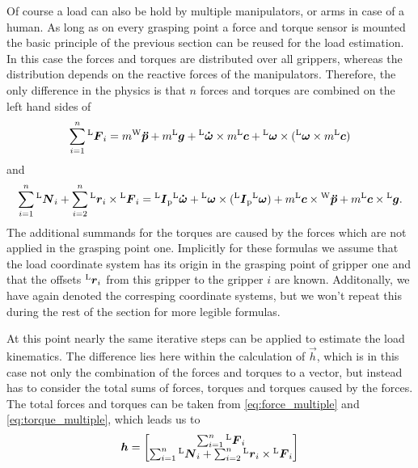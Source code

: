 Of course a load can also be hold by multiple manipulators, or arms in case of a human. As long as on every grasping point a force and torque sensor is mounted the basic principle of the previous section can be reused for the load estimation. In this case the forces and torques are distributed over all grippers, whereas the distribution depends on the reactive forces of the manipulators. Therefore, the only difference in the physics is that $n$ forces and torques are combined on the left hand sides of
\begin{equation}
	\sum_{i = 1}^{n}  {^{\mathrm{L}}}\boldsymbol{F}_{i} = m {^{\mathrm{W}}}\boldsymbol{\ddot{p}} + m {^{\mathrm{L}}}\boldsymbol{g} + {^{\mathrm{L}}}\boldsymbol{\dot{\omega}} \times m {^{\mathrm{L}}}\boldsymbol{c} + {^{\mathrm{L}}}\boldsymbol{\omega} \times ({^{\mathrm{L}}}\boldsymbol{\omega} \times m {^{\mathrm{L}}}\boldsymbol{c})
	\label{eq:force_multiple}	
\end{equation}
and
\begin{equation}
	\sum_{i = 1}^n {^{\mathrm{L}}}\boldsymbol{N}_{i} + \sum_{i = 2}^n {^{\mathrm{L}}}\boldsymbol{r}_{i} \times {^{\mathrm{L}}}\boldsymbol{F}_{i} = {^{\mathrm{L}}}\boldsymbol{I}_{\mathrm{p}} {^{\mathrm{L}}}\boldsymbol{\dot{\omega}} + {^{\mathrm{L}}}\boldsymbol{\omega} \times ({^{\mathrm{L}}}\boldsymbol{I}_{\mathrm{p}} {^{\mathrm{L}}}\boldsymbol{\omega}) + m {^{\mathrm{L}}}\boldsymbol{c} \times {^{\mathrm{W}}}\boldsymbol{\ddot{p}} + m {^{\mathrm{L}}}\boldsymbol{c} \times {^{\mathrm{L}}}\boldsymbol{g}.
	\label{eq:torque_multiple}	
\end{equation}
The additional summands for the torques are caused by the forces which are not applied in the grasping point one. Implicitly for these formulas we assume that the load coordinate system has its origin in the grasping point of gripper one and that the offsets ${^{\mathrm{L}}}\boldsymbol{r}_{i}$ from this gripper to the gripper $i$ are known. Additonally, we have again denoted the corresping coordinate systems, but we won't repeat this during the rest of the section for more legible formulas.

At this point nearly the same iterative steps can be applied to estimate the load kinematics. The difference lies here within the calculation of $\vec{h}$, which is in this case not only the combination of the forces and torques to a vector, but instead has to consider the total sums of forces, torques and torques caused by the forces. The total forces and torques can be taken from \ref{eq:force_multiple} and \ref{eq:torque_multiple}, which leads us to
\begin{equation}
	\boldsymbol{h} = 
	\begin{bmatrix}
		\sum_{i = 1}^n {^{\mathrm{L}}}\boldsymbol{F}_{i} \\
		\sum_{i = 1}^n {^{\mathrm{L}}}\boldsymbol{N}_{i} + \sum_{i = 2}^n {^{\mathrm{L}}}\boldsymbol{r}_{i} \times {^{\mathrm{L}}}\boldsymbol{F}_{i}
	\end{bmatrix}
\end{equation}

